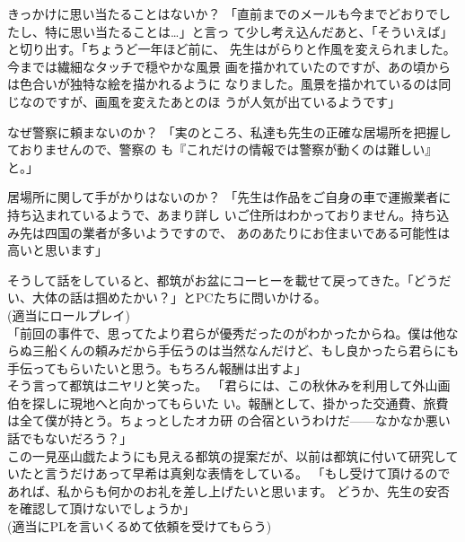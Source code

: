 \documentclass[a4paper,8pt,min]{jsarticle}
\begin{document}
\begin{topic}
 \item[きっかけに思い当たることはないか？]
 「直前までのメールも今までどおりでしたし、特に思い当たることは…」と言っ
 て少し考え込んだあと、「そういえば」と切り出す。「ちょうど一年ほど前に、
 先生はがらりと作風を変えられました。今までは繊細なタッチで穏やかな風景
 画を描かれていたのですが、あの頃からは色合いが独特な絵を描かれるように
 なりました。風景を描かれているのは同じなのですが、画風を変えたあとのほ
 うが人気が出ているようです」

\item[なぜ警察に頼まないのか？]
 「実のところ、私達も先生の正確な居場所を把握しておりませんので、警察の
 も『これだけの情報では警察が動くのは難しい』と。」

\item[居場所に関して手がかりはないのか？]
 「先生は作品をご自身の車で運搬業者に持ち込まれているようで、あまり詳し
 いご住所はわかっておりません。持ち込み先は四国の業者が多いようですので、
 あのあたりにお住まいである可能性は高いと思います」\\
 
\end{topic}
\newpage

そうして話をしていると、都筑がお盆にコーヒーを載せて戻ってきた。「どうだ
い、大体の話は掴めたかい？」とPCたちに問いかける。\\


(適当にロールプレイ)\\

「前回の事件で、思ってたより君らが優秀だったのがわかったからね。僕は他な
らぬ三船くんの頼みだから手伝うのは当然なんだけど、もし良かったら君らにも
手伝ってもらいたいと思う。もちろん報酬は出すよ」\\
そう言って都筑はニヤリと笑った。
「君らには、この秋休みを利用して外山画伯を探しに現地へと向かってもらいた
い。報酬として、掛かった交通費、旅費は全て僕が持とう。ちょっとしたオカ研
の合宿というわけだ------なかなか悪い話でもないだろう？」\\

この一見巫山戯たようにも見える都筑の提案だが、以前は都筑に付いて研究して
いたと言うだけあって早希は真剣な表情をしている。
「もし受けて頂けるのであれば、私からも何かのお礼を差し上げたいと思います。
どうか、先生の安否を確認して頂けないでしょうか」\\

(適当にPLを言いくるめて依頼を受けてもらう)\\
\end{document}
